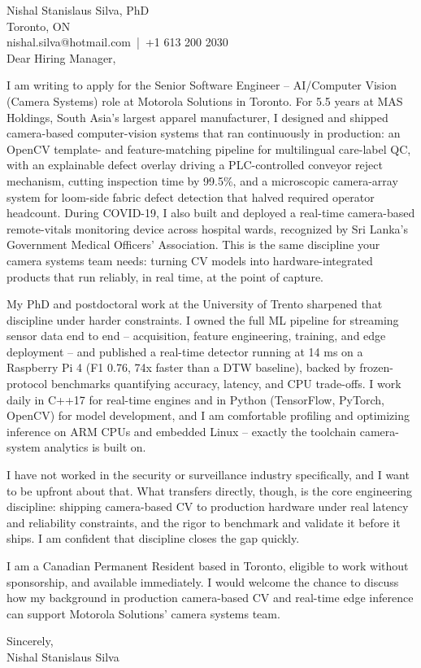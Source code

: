 \documentclass[11pt]{article}
\begin{document}
\pagestyle{empty}

\noindent
Nishal Stanislaus Silva, PhD \\
Toronto, ON \\
nishal.silva@hotmail.com \,|\, +1 613 200 2030 \\[1em]

\noindent Dear Hiring Manager,

\vspace{0.5em}
\noindent I am writing to apply for the Senior Software Engineer -- AI/Computer Vision (Camera Systems) role at Motorola Solutions in Toronto. For 5.5 years at MAS Holdings, South Asia's largest apparel manufacturer, I designed and shipped camera-based computer-vision systems that ran continuously in production: an OpenCV template- and feature-matching pipeline for multilingual care-label QC, with an explainable defect overlay driving a PLC-controlled conveyor reject mechanism, cutting inspection time by 99.5\%, and a microscopic camera-array system for loom-side fabric defect detection that halved required operator headcount. During COVID-19, I also built and deployed a real-time camera-based remote-vitals monitoring device across hospital wards, recognized by Sri Lanka's Government Medical Officers' Association. This is the same discipline your camera systems team needs: turning CV models into hardware-integrated products that run reliably, in real time, at the point of capture.

\vspace{0.5em}
\noindent My PhD and postdoctoral work at the University of Trento sharpened that discipline under harder constraints. I owned the full ML pipeline for streaming sensor data end to end -- acquisition, feature engineering, training, and edge deployment -- and published a real-time detector running at 14 ms on a Raspberry Pi 4 (F1 0.76, 74x faster than a DTW baseline), backed by frozen-protocol benchmarks quantifying accuracy, latency, and CPU trade-offs. I work daily in C++17 for real-time engines and in Python (TensorFlow, PyTorch, OpenCV) for model development, and I am comfortable profiling and optimizing inference on ARM CPUs and embedded Linux -- exactly the toolchain camera-system analytics is built on.

\vspace{0.5em}
\noindent I have not worked in the security or surveillance industry specifically, and I want to be upfront about that. What transfers directly, though, is the core engineering discipline: shipping camera-based CV to production hardware under real latency and reliability constraints, and the rigor to benchmark and validate it before it ships. I am confident that discipline closes the gap quickly.

\vspace{0.5em}
\noindent I am a Canadian Permanent Resident based in Toronto, eligible to work without sponsorship, and available immediately. I would welcome the chance to discuss how my background in production camera-based CV and real-time edge inference can support Motorola Solutions' camera systems team.

\vspace{1em}
\noindent Sincerely, \\
Nishal Stanislaus Silva
\end{document}

